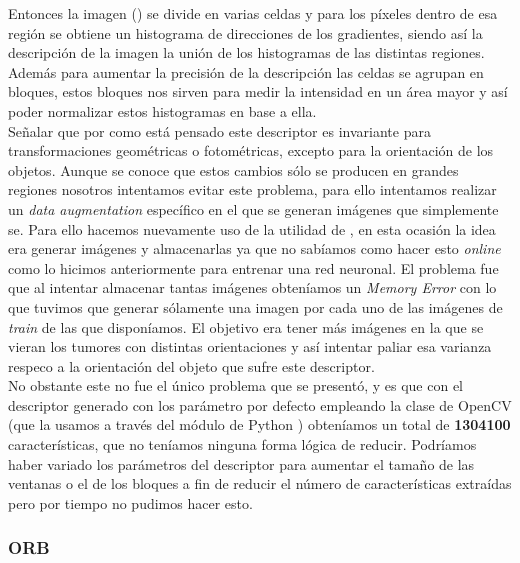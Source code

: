 Entonces la imagen () se divide en varias celdas y para los píxeles dentro de esa región se obtiene un histograma de direcciones de los gradientes, siendo así la descripción de la imagen la unión de los histogramas de las distintas regiones. Además para aumentar la precisión de la descripción las celdas se agrupan en bloques, estos bloques nos sirven para medir la intensidad en un área mayor y así poder normalizar estos histogramas en base a ella.\\

Señalar que por como está pensado este descriptor es invariante para transformaciones geométricas o fotométricas, excepto para la orientación de los objetos. Aunque se conoce que estos cambios sólo se producen en grandes regiones nosotros intentamos evitar este problema, para ello intentamos realizar un \textit{data augmentation} específico en el que se generan imágenes que simplemente se. Para ello hacemos nuevamente uso de la utilidad de  , en esta ocasión la idea era generar imágenes y almacenarlas ya que no sabíamos como hacer esto \textit{online} como lo hicimos anteriormente para entrenar una red neuronal. El problema fue que al intentar almacenar tantas imágenes obteníamos un \textit{Memory Error} con lo que tuvimos que generar sólamente una imagen por cada uno de las imágenes de \textit{train} de las que disponíamos. El objetivo era tener más imágenes en la que se vieran los tumores con distintas orientaciones y así intentar paliar esa varianza respeco a la orientación del objeto que sufre este descriptor.\\

No obstante este no fue el único problema que se presentó, y es que con el descriptor generado con los parámetro por defecto empleando la clase  de OpenCV (que la usamos a través del módulo de Python ) obteníamos un total de \textbf{1304100} características, que no teníamos ninguna forma lógica de reducir. Podríamos haber variado los parámetros del descriptor para aumentar el tamaño de las ventanas o el de los bloques a fin de reducir el número de características extraídas pero por tiempo no pudimos hacer esto.

\subsubsection{ORB}

